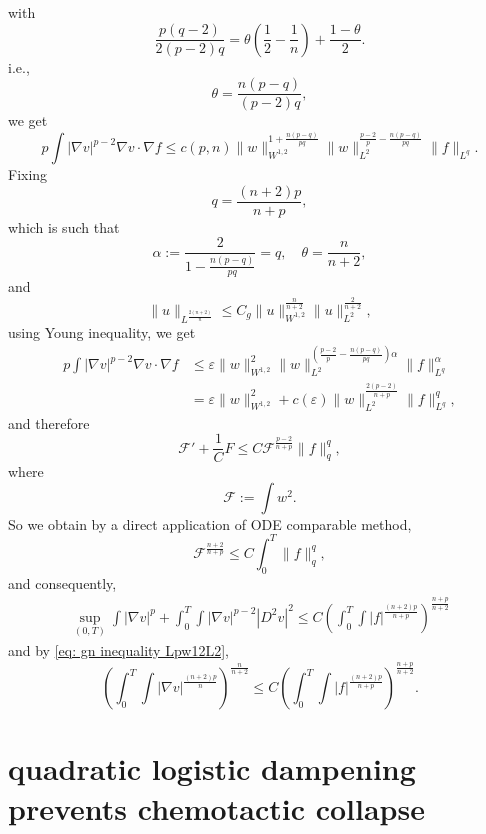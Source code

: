 with
\[
	\frac{p(q-2)}{2(p-2)q} = \theta\left(\frac12-\frac1n\right) + \frac{1-\theta}{2}.
\]
i.e.,
\[
	\theta = \frac{n(p-q)}{(p-2)q},
\]
we get
\begin{equation*}
	p\int |\nabla v|^{p-2}\nabla v \cdot \nabla f 
	\leq c(p,n) \|w\|_{W^{1,2}}^{1+\frac{n(p-q)}{pq}}
		\|w\|_{L^2}^{\frac{p-2}{p} - \frac{n(p-q)}{pq}}
		\|f\|_{L^q}.
\end{equation*}
Fixing 
\[
	q = \frac{(n+2)p}{n+p},
\]
which is such that
\[
	\alpha := \frac{2}{1-\frac{n(p-q)}{pq}} = q,\quad \theta = \frac{n}{n+2},
\]
and 
\begin{equation}\label{eq: gn inequality Lpw12L2}
	\|u\|_{L^{\frac{2(n+2)}{n}}} \leq C_g \|u\|_{W^{1,2}}^{\frac{n}{n+2}}\|u\|_{L^2}^{\frac{2}{n+2}},
\end{equation}
using Young inequality, we get
\begin{align*}
	p\int |\nabla v|^{p-2}\nabla v \cdot \nabla f 
	&\leq \varepsilon \|w\|_{W^{1,2}}^2
		\|w\|_{L^2}^{\left(\frac{p-2}{p} - \frac{n(p-q)}{pq}\right)\alpha}
		\|f\|_{L^q}^\alpha\\
	&= \varepsilon \|w\|_{W^{1,2}}^2
	+ c(\varepsilon) \|w\|_{L^2}^{\frac{2(p-2)}{n+p}}
	\|f\|_{L^q}^q,
\end{align*}
and therefore
\begin{equation*}
	\mathcal{F}' + \frac1C F \leq C \mathcal{F}^{\frac{p-2}{n+p}} \|f\|_q^q, 
\end{equation*} 
where
\[
	\mathcal{F} := \int w^2.
\]
So we obtain by a direct application of ODE comparable method,
\[
	\mathcal{F}^{\frac{n+2}{n+p}} \leq C \int_0^T\|f\|_q^q,
\]
and consequently,
\begin{align*}
	\sup_{(0,T)}\int |\nabla v|^p + \int_0^T\int |\nabla v|^{p-2}|D^2 v|^2 
	\leq C \left(\int_0^T\int |f|^{\frac{(n+2)p}{n+p}}\right)^{\frac{n+p}{n+2}}
\end{align*}
and by \eqref{eq: gn inequality Lpw12L2},
\begin{equation*}
	\left(\int_0^T\int |\nabla v|^{\frac{(n+2)p}{n}}\right)^{\frac{n}{n+2}} 
	\leq C \left(\int_0^T\int |f|^{\frac{(n+2)p}{n+p}}\right)^{\frac{n+p}{n+2}}. 
\end{equation*}

\section{quadratic logistic dampening prevents chemotactic collapse}

